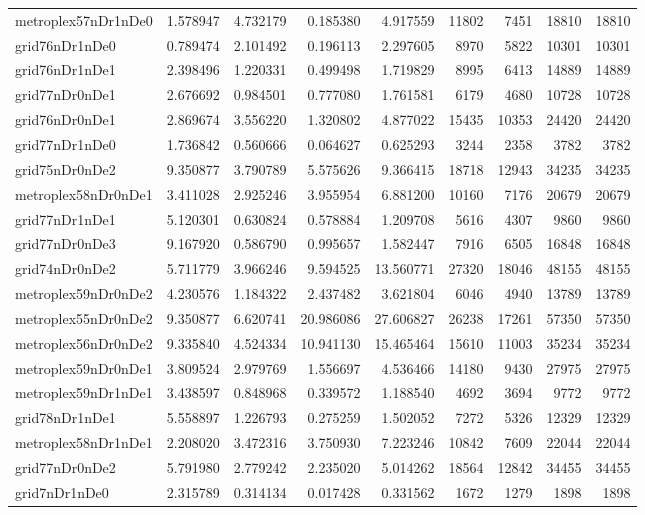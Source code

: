 \begin{longtable}{|l|r|r|r|r|r|r|r|r|}
metroplex57nDr1nDe0 & 1.578947 & 4.732179 & 0.185380 & 4.917559 & 11802 & 7451 & 18810 & 18810 \\
grid76nDr1nDe0 & 0.789474 & 2.101492 & 0.196113 & 2.297605 & 8970 & 5822 & 10301 & 10301 \\
grid76nDr1nDe1 & 2.398496 & 1.220331 & 0.499498 & 1.719829 & 8995 & 6413 & 14889 & 14889 \\
grid77nDr0nDe1 & 2.676692 & 0.984501 & 0.777080 & 1.761581 & 6179 & 4680 & 10728 & 10728 \\
grid76nDr0nDe1 & 2.869674 & 3.556220 & 1.320802 & 4.877022 & 15435 & 10353 & 24420 & 24420 \\
grid77nDr1nDe0 & 1.736842 & 0.560666 & 0.064627 & 0.625293 & 3244 & 2358 & 3782 & 3782 \\
grid75nDr0nDe2 & 9.350877 & 3.790789 & 5.575626 & 9.366415 & 18718 & 12943 & 34235 & 34235 \\
metroplex58nDr0nDe1 & 3.411028 & 2.925246 & 3.955954 & 6.881200 & 10160 & 7176 & 20679 & 20679 \\
grid77nDr1nDe1 & 5.120301 & 0.630824 & 0.578884 & 1.209708 & 5616 & 4307 & 9860 & 9860 \\
grid77nDr0nDe3 & 9.167920 & 0.586790 & 0.995657 & 1.582447 & 7916 & 6505 & 16848 & 16848 \\
grid74nDr0nDe2 & 5.711779 & 3.966246 & 9.594525 & 13.560771 & 27320 & 18046 & 48155 & 48155 \\
metroplex59nDr0nDe2 & 4.230576 & 1.184322 & 2.437482 & 3.621804 & 6046 & 4940 & 13789 & 13789 \\
metroplex55nDr0nDe2 & 9.350877 & 6.620741 & 20.986086 & 27.606827 & 26238 & 17261 & 57350 & 57350 \\
metroplex56nDr0nDe2 & 9.335840 & 4.524334 & 10.941130 & 15.465464 & 15610 & 11003 & 35234 & 35234 \\
metroplex59nDr0nDe1 & 3.809524 & 2.979769 & 1.556697 & 4.536466 & 14180 & 9430 & 27975 & 27975 \\
metroplex59nDr1nDe1 & 3.438597 & 0.848968 & 0.339572 & 1.188540 & 4692 & 3694 & 9772 & 9772 \\
grid78nDr1nDe1 & 5.558897 & 1.226793 & 0.275259 & 1.502052 & 7272 & 5326 & 12329 & 12329 \\
metroplex58nDr1nDe1 & 2.208020 & 3.472316 & 3.750930 & 7.223246 & 10842 & 7609 & 22044 & 22044 \\
grid77nDr0nDe2 & 5.791980 & 2.779242 & 2.235020 & 5.014262 & 18564 & 12842 & 34455 & 34455 \\
grid7nDr1nDe0 & 2.315789 & 0.314134 & 0.017428 & 0.331562 & 1672 & 1279 & 1898 & 1898 \\

\end{longtable}
